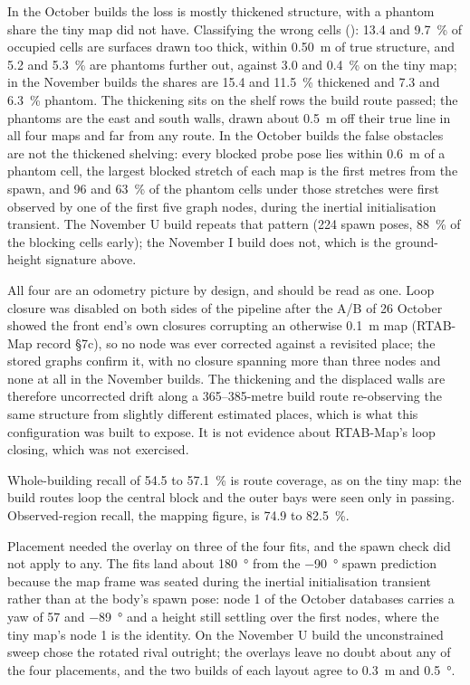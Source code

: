 \documentclass[11pt,a4paper,notitlepage]{report}
\begin{document}
In the October builds the loss is mostly thickened structure, with a phantom
share the tiny map did not have. Classifying the wrong cells
(): 13.4 and \SI{9.7}{\percent} of occupied
cells are surfaces drawn too thick, within \SI{0.50}{\metre} of true
structure, and 5.2 and \SI{5.3}{\percent} are phantoms further out, against
3.0 and \SI{0.4}{\percent} on the tiny map; in the November builds the shares
are 15.4 and \SI{11.5}{\percent} thickened and 7.3 and \SI{6.3}{\percent}
phantom. The thickening sits on the shelf rows the build route passed; the
phantoms are the east and south walls, drawn about \SI{0.5}{\metre} off their
true line in all four maps and far from any route. In the October builds the
false obstacles are not the thickened shelving: every blocked probe pose lies
within \SI{0.6}{\metre} of a phantom cell, the largest blocked stretch of each
map is the first metres from the spawn, and 96 and \SI{63}{\percent} of the
phantom cells under those stretches were first observed by one of the first
five graph nodes, during the inertial initialisation transient. The November U
build repeats that pattern (224 spawn poses, \SI{88}{\percent} of the blocking
cells early); the November I build does not, which is the ground-height
signature above.

All four are an odometry picture by design, and should be read as one. Loop
closure was disabled on both sides of the pipeline after the A/B of 26 October
showed the front end's own closures corrupting an otherwise \SI{0.1}{\metre}
map (RTAB-Map record \S7c), so no node was ever corrected against a revisited
place; the stored graphs confirm it, with no closure spanning more than three
nodes and none at all in the November builds. The thickening and the displaced
walls are therefore uncorrected drift along a 365--385-metre build route
re-observing the same structure from slightly different estimated places,
which is what this configuration was built to expose. It is not evidence
about RTAB-Map's loop closing, which was not exercised.

Whole-building recall of 54.5 to \SI{57.1}{\percent} is route coverage, as on
the tiny map: the build routes loop the central block and the outer bays were
seen only in passing. Observed-region recall, the mapping figure, is 74.9 to
\SI{82.5}{\percent}.

Placement needed the overlay on three of the four fits, and the spawn check
did not apply to any. The fits land about \SI{180}{\degree} from the
\SI{-90}{\degree} spawn prediction because the map frame was seated during the
inertial initialisation transient rather than at the body's spawn pose: node 1
of the October databases carries a yaw of \SI{57}{} and \SI{-89}{\degree} and a
height still settling over the first nodes, where the tiny map's node 1 is the
identity. On the November U build the unconstrained sweep chose the rotated
rival outright; the overlays leave no doubt about any of the four placements,
and the two builds of each layout agree to \SI{0.3}{\metre} and
\SI{0.5}{\degree}.
\end{document}
